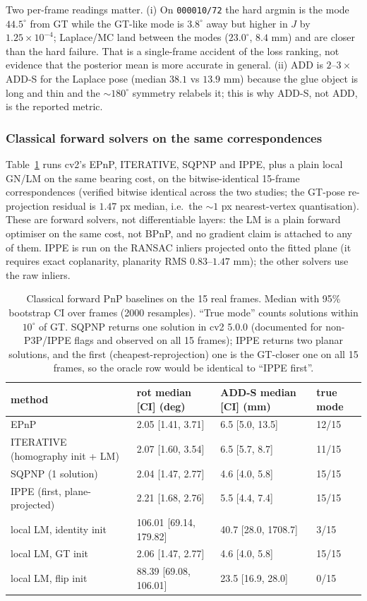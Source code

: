 Two per-frame readings matter. (i) On \texttt{000010/72} the hard argmin is the mode $44.5^\circ$ from GT while the GT-like mode is $3.8^\circ$ away but higher in $J$ by $1.25\times10^{-4}$; Laplace/MC land between the modes ($23.0^\circ$, $8.4$ mm) and are closer than the hard failure. That is a single-frame accident of the loss ranking, not evidence that the posterior mean is more accurate in general. (ii) ADD is $2$--$3\times$ ADD-S for the Laplace pose (median $38.1$ vs $13.9$ mm) because the glue object is long and thin and the $\sim180^\circ$ symmetry relabels it; this is why ADD-S, not ADD, is the reported metric.

\subsubsection{Classical forward solvers on the same correspondences}\label{sec:classical}

Table~\ref{tab:classical} runs cv2's EPnP, ITERATIVE, SQPNP and IPPE, plus a plain local GN/LM on the same bearing cost, on the bitwise-identical 15-frame correspondences (verified bitwise identical across the two studies; the GT-pose re-projection residual is $1.47$ px median, i.e.\ the $\sim1$ px nearest-vertex quantisation). These are forward solvers, not differentiable layers: the LM is a plain forward optimiser on the same cost, not BPnP, and no gradient claim is attached to any of them. IPPE is run on the RANSAC inliers projected onto the fitted plane (it requires exact coplanarity, planarity RMS $0.83$--$1.47$ mm); the other solvers use the raw inliers.

\begin{table}[t]
\centering
\caption{Classical forward PnP baselines on the 15 real frames. Median with 95\% bootstrap CI over frames (2000 resamples). ``True mode'' counts solutions within $10^\circ$ of GT. SQPNP returns one solution in cv2 5.0.0 (documented for non-P3P/IPPE flags and observed on all 15 frames); IPPE returns two planar solutions, and the first (cheapest-reprojection) one is the GT-closer one on all 15 frames, so the oracle row would be identical to ``IPPE first''.}
\label{tab:classical}
\scriptsize
\setlength{\tabcolsep}{4pt}
\begin{tabular}{@{}l l l l@{}}
\toprule
method & rot median [CI] (deg) & ADD-S median [CI] (mm) & true mode\\
\midrule
EPnP & 2.05 [1.41, 3.71] & 6.5 [5.0, 13.5] & 12/15\\
ITERATIVE (homography init + LM) & 2.07 [1.60, 3.54] & 6.5 [5.7, 8.7] & 11/15\\
SQPNP (1 solution) & 2.04 [1.47, 2.77] & 4.6 [4.0, 5.8] & 15/15\\
IPPE (first, plane-projected) & 2.21 [1.68, 2.76] & 5.5 [4.4, 7.4] & 15/15\\
local LM, identity init & 106.01 [69.14, 179.82] & 40.7 [28.0, 1708.7] & 3/15\\
local LM, GT init & 2.06 [1.47, 2.77] & 4.6 [4.0, 5.8] & 15/15\\
local LM, flip init & 88.39 [69.08, 106.01] & 23.5 [16.9, 28.0] & 0/15\\
\bottomrule
\end{tabular}
\end{table}

